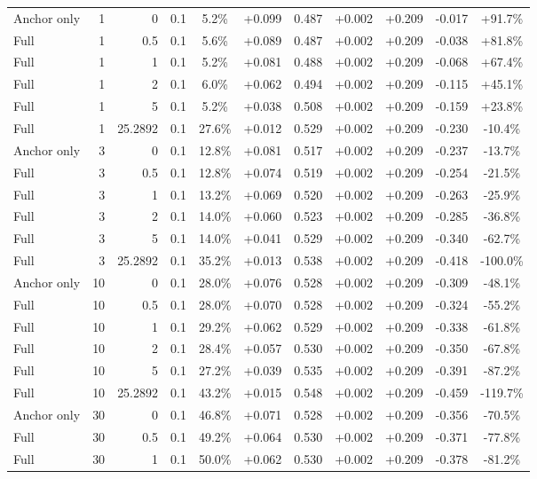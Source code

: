 \begin{table}[htbp]
\begin{tabular}{lrrrccccccc}
Anchor only & 1 & 0 & 0.1 & 5.2\% & +0.099 & 0.487 & +0.002 & +0.209 & -0.017 & +91.7\% \\
Full & 1 & 0.5 & 0.1 & 5.6\% & +0.089 & 0.487 & +0.002 & +0.209 & -0.038 & +81.8\% \\
Full & 1 & 1 & 0.1 & 5.2\% & +0.081 & 0.488 & +0.002 & +0.209 & -0.068 & +67.4\% \\
Full & 1 & 2 & 0.1 & 6.0\% & +0.062 & 0.494 & +0.002 & +0.209 & -0.115 & +45.1\% \\
Full & 1 & 5 & 0.1 & 5.2\% & +0.038 & 0.508 & +0.002 & +0.209 & -0.159 & +23.8\% \\
Full & 1 & 25.2892 & 0.1 & 27.6\% & +0.012 & 0.529 & +0.002 & +0.209 & -0.230 & -10.4\% \\
Anchor only & 3 & 0 & 0.1 & 12.8\% & +0.081 & 0.517 & +0.002 & +0.209 & -0.237 & -13.7\% \\
Full & 3 & 0.5 & 0.1 & 12.8\% & +0.074 & 0.519 & +0.002 & +0.209 & -0.254 & -21.5\% \\
Full & 3 & 1 & 0.1 & 13.2\% & +0.069 & 0.520 & +0.002 & +0.209 & -0.263 & -25.9\% \\
Full & 3 & 2 & 0.1 & 14.0\% & +0.060 & 0.523 & +0.002 & +0.209 & -0.285 & -36.8\% \\
Full & 3 & 5 & 0.1 & 14.0\% & +0.041 & 0.529 & +0.002 & +0.209 & -0.340 & -62.7\% \\
Full & 3 & 25.2892 & 0.1 & 35.2\% & +0.013 & 0.538 & +0.002 & +0.209 & -0.418 & -100.0\% \\
Anchor only & 10 & 0 & 0.1 & 28.0\% & +0.076 & 0.528 & +0.002 & +0.209 & -0.309 & -48.1\% \\
Full & 10 & 0.5 & 0.1 & 28.0\% & +0.070 & 0.528 & +0.002 & +0.209 & -0.324 & -55.2\% \\
Full & 10 & 1 & 0.1 & 29.2\% & +0.062 & 0.529 & +0.002 & +0.209 & -0.338 & -61.8\% \\
Full & 10 & 2 & 0.1 & 28.4\% & +0.057 & 0.530 & +0.002 & +0.209 & -0.350 & -67.8\% \\
Full & 10 & 5 & 0.1 & 27.2\% & +0.039 & 0.535 & +0.002 & +0.209 & -0.391 & -87.2\% \\
Full & 10 & 25.2892 & 0.1 & 43.2\% & +0.015 & 0.548 & +0.002 & +0.209 & -0.459 & -119.7\% \\
Anchor only & 30 & 0 & 0.1 & 46.8\% & +0.071 & 0.528 & +0.002 & +0.209 & -0.356 & -70.5\% \\
Full & 30 & 0.5 & 0.1 & 49.2\% & +0.064 & 0.530 & +0.002 & +0.209 & -0.371 & -77.8\% \\
Full & 30 & 1 & 0.1 & 50.0\% & +0.062 & 0.530 & +0.002 & +0.209 & -0.378 & -81.2\% \\

\end{tabular}
\end{table}
